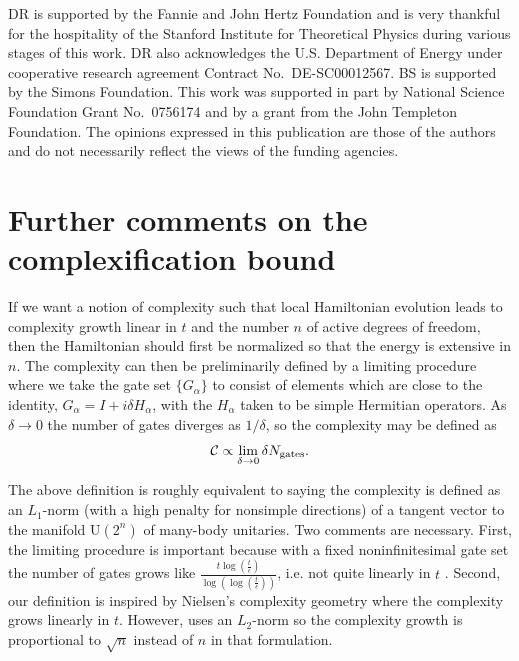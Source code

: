 \documentclass[12pt]{article}
\numberwithin{equation}{section}
\newcommand{\beq}{\begin{equation}}
\newcommand{\eeq}{\end{equation}}
\def\({\left(}
\def\){\right)}
\def\CC{{\cal C}}
\begin{document}
DR is supported by the Fannie and John Hertz Foundation and is very thankful for the hospitality of the Stanford Institute for Theoretical Physics during various stages of this work. DR also acknowledges the U.S. Department of Energy under cooperative research agreement Contract No.~DE-SC00012567. BS is supported by the Simons Foundation. This work was supported in part by National Science Foundation Grant No.~0756174 and by a grant from the John Templeton Foundation.
The opinions expressed in this publication are those of the authors and do not necessarily
reflect the views of the funding agencies.

\appendix



\section{Further comments on the complexification bound}
\label{sec:boundapp}

If we want a notion of complexity such that local Hamiltonian evolution leads to complexity growth linear in $t$ and the number $n$ of active degrees of freedom, then the Hamiltonian should first be normalized so that the energy is extensive in $n$. The complexity can then be preliminarily defined by a limiting procedure where we take the gate set $\{G_\alpha\}$ to consist of elements which are close to the identity, $G_\alpha = I + i \delta H_\alpha$, with the $H_\alpha$ taken to be simple Hermitian operators. As $\delta \rightarrow 0$ the number of gates diverges as $1/\delta$, so the complexity may be defined as
\beq
\CC \propto \lim_{\delta \rightarrow 0} \delta N_{\text{gates}}.
\eeq

The above definition is roughly equivalent to saying the complexity is defined as an $L_1$-norm (with a high penalty for nonsimple directions) of a tangent vector to the manifold U$(2^n)$ of many-body unitaries. Two comments are necessary. First, the limiting procedure is important because with a fixed noninfinitesimal gate set the number of gates grows like $\frac{t \log\(\frac{t}{\epsilon}\)}{\log\(\log\(\frac{t}{\epsilon}\)\)}$, i.e. not quite linearly in $t$ \cite{opthamsim}. Second, our definition is inspired by Nielsen's complexity geometry \cite{nielsenmetric} where the complexity grows linearly in $t$. However, \cite{nielsenmetric} uses an $L_2$-norm so the complexity growth is proportional to $\sqrt{n}$ instead of $n$ in that formulation.
\end{document}
